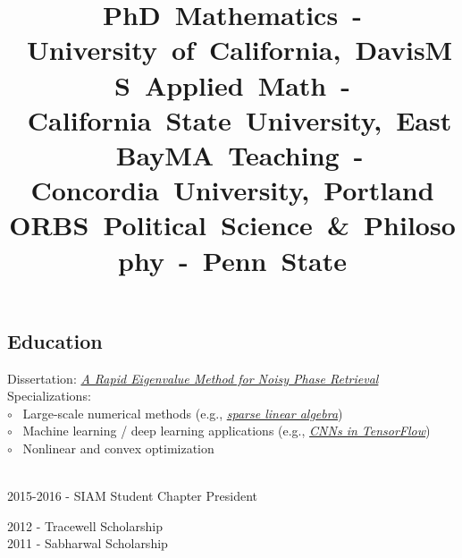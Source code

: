 \documentclass[12pt,margintitle,line]{res}
\begin{document}
\begin{resume}


\vspace{-1.3cm}

\section{Education}

\vspace{-0.5cm}
\title{\mbox{PhD  Mathematics - University of California, Davis}}
\dates{}
\begin{position}
Dissertation: 
\href{https://github.com/Will-Wright/dissertation-rapid_eigenvalue_method_for_noisy_phase_retrieval/blob/master/will_wright_dissertation.pdf} {\textsl{A Rapid Eigenvalue Method for Noisy Phase Retrieval}}
	\\
Specializations: 
	\\
$\circ$ \ Large-scale numerical methods (e.g., \href{https://github.com/Will-Wright/image-segmentation/tree/master/src}{\textsl{sparse linear algebra}})
	\\
$\circ$ \ Machine learning / deep learning applications (e.g., \href{https://github.com/Will-Wright/MNIST-CNN}{\textsl{CNNs in TensorFlow}})
	\\
$\circ$ \ Nonlinear and convex optimization
\end{position}
\\
2015-2016 - SIAM Student Chapter President


\vspace{-0.75cm}
\title{\mbox{MS  Applied Math - California State University, East Bay}}
\dates{}
\begin{position}
2012 - Tracewell Scholarship
	\\
2011 - Sabharwal Scholarship
\end{position}


\vspace{-0.75cm}
\title{\mbox{MA Teaching - Concordia University, Portland OR}}
\dates{}
\begin{position}
\end{position}


\vspace{-1.8cm}
\title{\mbox{BS  Political Science \& Philosophy - Penn State}}
\dates{}
\begin{position}
\end{position}






\end{resume}
\end{document}
